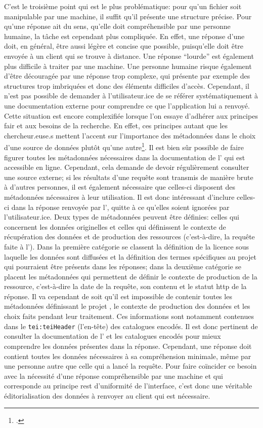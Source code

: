C'est le troisième point qui est le plus problématique: pour qu'un fichier soit manipulable par une machine, il suffit qu'il présente une structure précise. Pour qu'une réponse ait du sens, qu'elle doit compréhensible par une personne humaine, la tâche est cependant plus compliquée. En effet, une réponse d'une \api{} doit, en général, être aussi légère et concise que possible, puisqu'elle doit être envoyée à un client qui se trouve à distance. Une réponse \enquote{lourde} est également plus difficile à traiter par une machine. Une personne humaine risque également d'être découragée par une réponse trop complexe, qui présente par exemple des structures trop imbriquées et donc des éléments difficiles d'accès. Cependant, il n'est pas possible de demander à l'utilisateur.ice de se référer systématiquement à une documentation externe pour comprendre ce que l'application lui a renvoyé. Cette situation est encore complexifiée lorsque l'on essaye d'adhérer aux principes \gls{fair} et aux besoins de la recherche. En effet, ces principes autant que les chercheur.euse.s mettent l'accent sur l'importance des métadonnées dans le choix d'une source de données plutôt qu'une autre\footcite[p. 290-291 et p. 932-933 respectivement]{edmond_apis_2015, boeckhout_fair_2018}. Il est bien sûr possible de faire figurer toutes les métadonnées nécessaires dans la documentation de l'\api{} qui est accessible en ligne. Cependant, cela demande de devoir régulièrement consulter une source externe; si les résultats d'une requête sont transmis de manière brute à d'autres personnes, il est également nécessaire que celles-ci disposent des métadonnées nécessaires à leur utilisation. Il est donc intéressant d'inclure celles-ci dans la réponse renvoyée par l'\api{}, quitte à ce qu'elles soient ignorées par l'utilisateur.ice. Deux types de métadonnées peuvent être définies: celles qui concernent les données originelles et celles qui définissent le contexte de récupération des données et de production des ressources (c'est-à-dire, la requête faite à l'\api{}). Dans la première catégorie se classent la définition de la licence sous laquelle les données sont diffusées et la définition des termes spécifiques au projet qui pourraient être présents dans les réponses; dans la deuxième catégorie se placent les métadonnées qui permettent de définir le contexte de production de la ressource, c'est-à-dire la date de la requête, son contenu et le statut \gls{http} de la réponse. Il va cependant de soit qu'il est impossible de contenir toutes les métadonnées définissant le projet \ktb{}, le contexte de production des données et les choix faits pendant leur traitement. Ces informations sont notamment contenues dans le \texttt{tei:teiHeader} (l'en-tête) des catalogues encodés. Il est donc pertinent de consulter la documentation de l'\api{} et les catalogues encodés pour mieux comprendre les données présentes dans la réponse. Cependant, une réponse doit contient toutes les données nécessaires à sa compréhension minimale, même par une personne autre que celle qui a lancé la requête. Pour faire coïncider ce besoin avec la nécessité d'une réponse compréhensible par une machine et qui corresponde au principe \gls{rest} d'uniformité de l'interface, c'est donc une véritable éditorialisation des données à renvoyer au client qui est nécessaire.

